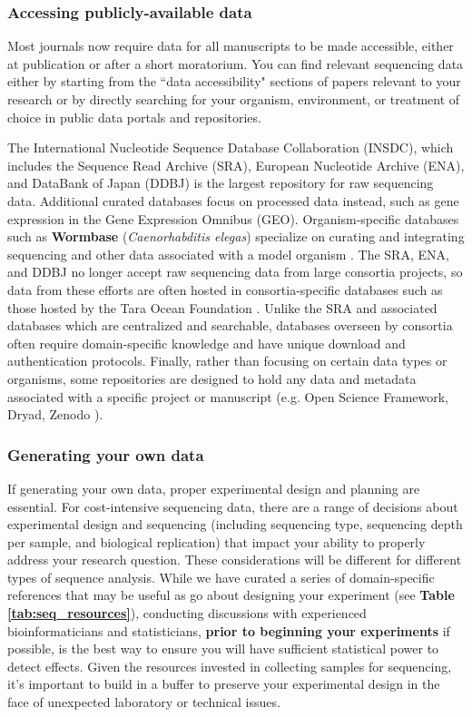 \documentclass[10pt,letterpaper]{article}
\begin{document}
\subsubsection*{Accessing publicly-available data}

Most journals now require data for all manuscripts to be made accessible, either at publication or after a short moratorium.
You can find relevant sequencing data either by starting from the ``data accessibility" sections of papers relevant to your research or by directly searching for your organism, environment, or treatment of choice in public data portals and repositories. 

The International Nucleotide Sequence Database Collaboration (INSDC), which includes the Sequence Read Archive (SRA), European Nucleotide Archive (ENA), and DataBank of Japan (DDBJ) is the largest repository for raw sequencing data. 
Additional curated databases focus on processed data instead, such as gene expression in the Gene Expression Omnibus (GEO).  
Organism-specific databases such as \textbf{Wormbase} (\textit{Caenorhabditis elegas}) specialize on curating and integrating sequencing and other data associated with a model organism \cite{harris2020wormbase}. 
The SRA, ENA, and DDBJ no longer accept raw sequencing data from large consortia projects, so data from these efforts are often hosted in consortia-specific databases such as those hosted by the Tara Ocean Foundation \cite{pesant2015open}.
Unlike the SRA and associated databases which are centralized and searchable, databases overseen by consortia often require domain-specific knowledge and have unique download and authentication protocols.
Finally, rather than focusing on certain data types or organisms, some repositories are designed to hold any data and metadata associated with a specific project or manuscript (e.g. Open Science Framework, Dryad, Zenodo \cite{foster2017open}).


\subsubsection*{Generating your own data}
If generating your own data, proper experimental design and planning are essential. 
For cost-intensive sequencing data, there are a range of decisions about experimental design and sequencing (including sequencing type, sequencing depth per sample, and biological replication) that impact your ability to properly address your research question. 
These considerations will be different for different types of sequence analysis. 
While we have curated a series of domain-specific references that may be useful as go about designing your experiment (see \textbf{Table \ref{tab:seq_resources}}), conducting discussions with experienced bioinformaticians and statisticians, \textbf{prior to beginning your experiments} if possible, is the best way to ensure you will have sufficient statistical power to detect effects.
Given the resources invested in collecting samples for sequencing, it's important to build in a buffer to preserve your experimental design in the face of unexpected laboratory or technical issues. 
\end{document}
